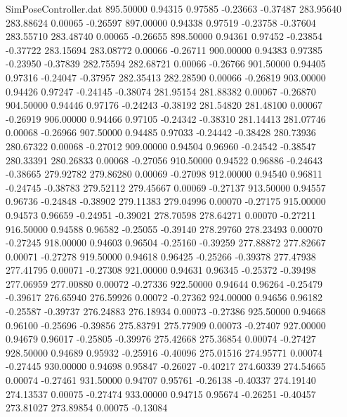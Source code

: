 \begin{filecontents}{SimPoseController.dat}
 895.50000    0.94315    0.97585    -0.23663   -0.37487  283.95640  283.88624    0.00065   -0.26597
 897.00000    0.94338    0.97519    -0.23758   -0.37604  283.55710  283.48740    0.00065   -0.26655
 898.50000    0.94361    0.97452    -0.23854   -0.37722  283.15694  283.08772    0.00066   -0.26711
 900.00000    0.94383    0.97385    -0.23950   -0.37839  282.75594  282.68721    0.00066   -0.26766
 901.50000    0.94405    0.97316    -0.24047   -0.37957  282.35413  282.28590    0.00066   -0.26819
 903.00000    0.94426    0.97247    -0.24145   -0.38074  281.95154  281.88382    0.00067   -0.26870
 904.50000    0.94446    0.97176    -0.24243   -0.38192  281.54820  281.48100    0.00067   -0.26919
 906.00000    0.94466    0.97105    -0.24342   -0.38310  281.14413  281.07746    0.00068   -0.26966
 907.50000    0.94485    0.97033    -0.24442   -0.38428  280.73936  280.67322    0.00068   -0.27012
 909.00000    0.94504    0.96960    -0.24542   -0.38547  280.33391  280.26833    0.00068   -0.27056
 910.50000    0.94522    0.96886    -0.24643   -0.38665  279.92782  279.86280    0.00069   -0.27098
 912.00000    0.94540    0.96811    -0.24745   -0.38783  279.52112  279.45667    0.00069   -0.27137
 913.50000    0.94557    0.96736    -0.24848   -0.38902  279.11383  279.04996    0.00070   -0.27175
 915.00000    0.94573    0.96659    -0.24951   -0.39021  278.70598  278.64271    0.00070   -0.27211
 916.50000    0.94588    0.96582    -0.25055   -0.39140  278.29760  278.23493    0.00070   -0.27245
 918.00000    0.94603    0.96504    -0.25160   -0.39259  277.88872  277.82667    0.00071   -0.27278
 919.50000    0.94618    0.96425    -0.25266   -0.39378  277.47938  277.41795    0.00071   -0.27308
 921.00000    0.94631    0.96345    -0.25372   -0.39498  277.06959  277.00880    0.00072   -0.27336
 922.50000    0.94644    0.96264    -0.25479   -0.39617  276.65940  276.59926    0.00072   -0.27362
 924.00000    0.94656    0.96182    -0.25587   -0.39737  276.24883  276.18934    0.00073   -0.27386
 925.50000    0.94668    0.96100    -0.25696   -0.39856  275.83791  275.77909    0.00073   -0.27407
 927.00000    0.94679    0.96017    -0.25805   -0.39976  275.42668  275.36854    0.00074   -0.27427
 928.50000    0.94689    0.95932    -0.25916   -0.40096  275.01516  274.95771    0.00074   -0.27445
 930.00000    0.94698    0.95847    -0.26027   -0.40217  274.60339  274.54665    0.00074   -0.27461
 931.50000    0.94707    0.95761    -0.26138   -0.40337  274.19140  274.13537    0.00075   -0.27474
 933.00000    0.94715    0.95674    -0.26251   -0.40457  273.81027  273.89854    0.00075   -0.13084

\end{filecontents}
